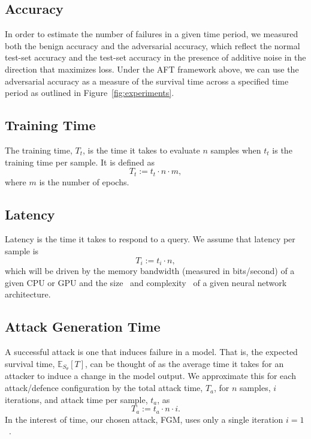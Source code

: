 \documentclass[conference]{IEEEtran}
\begin{document}
\subsection{Accuracy}

In order to estimate the number of failures in a given time period, we measured both the benign accuracy and the adversarial accuracy, which reflect the normal test-set accuracy and the test-set accuracy in the presence of additive noise in the direction that maximizes loss. Under the AFT framework above, we can use the adversarial accuracy as a measure of the survival time across a specified time period as outlined in Figure~\ref{fig:experiments}.


\subsection{Training Time}

The training time, $T_t$, is the time it takes to evaluate $n$ samples when $t_t$ is the training time per sample. It is defined as
$$
    T_t := t_t \cdot n  \cdot m,
$$
where $m$ is the number of epochs.


\subsection{Latency}

Latency is the time it takes to respond to a query. We assume that latency per sample is
$$
    T_i := t_i \cdot n,
$$
which will be driven by the memory bandwidth (measured in bits/second) of a given CPU or GPU and the size~\cite{vgg} and complexity~\cite{resnet} of a given neural network architecture.


\subsection{Attack Generation Time}

A successful attack is one that induces failure in a model. That is, the expected survival time, $\mathbb{E}_{S_\theta}[T]$, can be thought of as the average time it takes for an attacker to induce a change in the model output. We approximate this for each attack/defence configuration by the total attack time, $T_a$, for $n$ samples, $i$ iterations, and attack time per sample, $t_a$, as
\begin{equation}
    \label{attack_time}
    T_a := t_a \cdot n \cdot i.
\end{equation}
In the interest of time, our chosen attack, FGM, uses only a single iteration $i =1$~\cite{fgm}.
\end{document}
